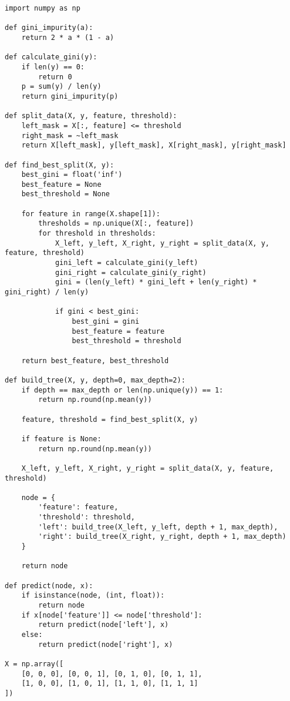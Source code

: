 \documentclass{article}
\begin{document}
{\tiny
\begin{verbatim}
import numpy as np

def gini_impurity(a):
    return 2 * a * (1 - a)

def calculate_gini(y):
    if len(y) == 0:
        return 0
    p = sum(y) / len(y)
    return gini_impurity(p)

def split_data(X, y, feature, threshold):
    left_mask = X[:, feature] <= threshold
    right_mask = ~left_mask
    return X[left_mask], y[left_mask], X[right_mask], y[right_mask]

def find_best_split(X, y):
    best_gini = float('inf')
    best_feature = None
    best_threshold = None

    for feature in range(X.shape[1]):
        thresholds = np.unique(X[:, feature])
        for threshold in thresholds:
            X_left, y_left, X_right, y_right = split_data(X, y, feature, threshold)
            gini_left = calculate_gini(y_left)
            gini_right = calculate_gini(y_right)
            gini = (len(y_left) * gini_left + len(y_right) * gini_right) / len(y)

            if gini < best_gini:
                best_gini = gini
                best_feature = feature
                best_threshold = threshold

    return best_feature, best_threshold

def build_tree(X, y, depth=0, max_depth=2):
    if depth == max_depth or len(np.unique(y)) == 1:
        return np.round(np.mean(y))

    feature, threshold = find_best_split(X, y)
    
    if feature is None:
        return np.round(np.mean(y))

    X_left, y_left, X_right, y_right = split_data(X, y, feature, threshold)

    node = {
        'feature': feature,
        'threshold': threshold,
        'left': build_tree(X_left, y_left, depth + 1, max_depth),
        'right': build_tree(X_right, y_right, depth + 1, max_depth)
    }

    return node

def predict(node, x):
    if isinstance(node, (int, float)):
        return node
    if x[node['feature']] <= node['threshold']:
        return predict(node['left'], x)
    else:
        return predict(node['right'], x)

X = np.array([
    [0, 0, 0], [0, 0, 1], [0, 1, 0], [0, 1, 1],
    [1, 0, 0], [1, 0, 1], [1, 1, 0], [1, 1, 1]
])


\end{verbatim}}
\end{document}
